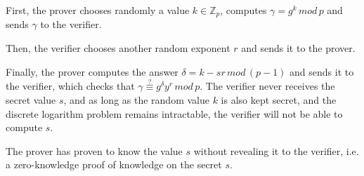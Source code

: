 First, the prover chooses randomly a value $k \in \mathbb{Z}_p$, computes $\gamma = g^k\, mod\, p$ and sends $\gamma$ to the verifier.

Then, the verifier chooses another random exponent $r$ and sends it to the prover.

Finally, the prover computes the answer $\delta=k-sr \, mod\, (p-1)$ and sends it to the verifier, which checks that $\gamma \overset{?}{\equiv} g^{\delta} y^r \, mod \, p$. The verifier never receives the secret value $s$, and as long as the random value $k$ is also kept secret, and the discrete logarithm problem remains intractable, the verifier will not be able to compute $s$.

The prover has proven to know the value $s$ without revealing it to the verifier, i.e. a zero-knowledge proof of knowledge on the secret $s$.
